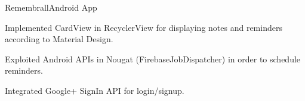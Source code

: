 \begin{rSubsection}{Remembrall}{\em }{Android App}{}
  \item Implemented CardView in RecyclerView for displaying notes and reminders according to Material Design.
  \item Exploited Android APIs in Nougat (FirebaseJobDispatcher) in order to schedule reminders.
  \item Integrated Google+ SignIn API for login/signup.
\end{rSubsection}